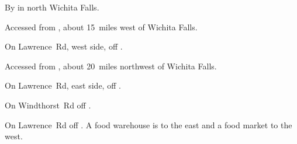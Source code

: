 
\begin{LocationList}

By   in north Wichita Falls.

Accessed from  , about 15~miles west of Wichita Falls.

On Lawrence~Rd, west side, off  .

Accessed from , about 20~miles northwest of Wichita Falls.

On Lawrence~Rd, east side, off  .

\Location{\TruckStop \Gas \Rest \Service \Weigh}
On Windthorst~Rd off  .

On Lawrence~Rd off  .
A food warehouse is to the east and a food market to the west.

\end{LocationList}
